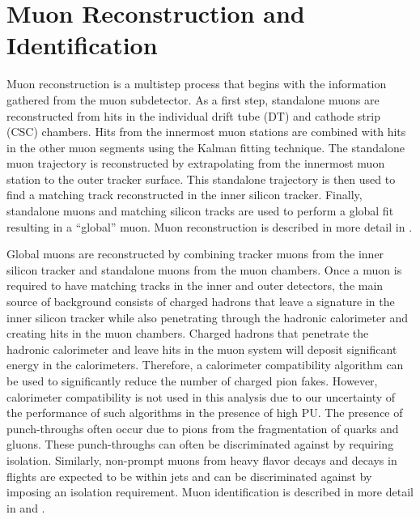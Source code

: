 \chapter{Muon Reconstruction and Identification}\label{ss:muonreco}

Muon reconstruction is a multistep process that begins with the information gathered from the muon subdetector. As a
first step, standalone muons are reconstructed from hits in the individual drift tube (DT) and
cathode strip (CSC) chambers. Hits from the innermost muon stations are combined with hits in the other muon segments
using the Kalman fitting technique. The standalone muon trajectory is reconstructed by extrapolating from the
innermost muon station to the outer tracker surface. This standalone trajectory is then used to find a matching track
reconstructed in the inner silicon tracker. Finally, standalone muons and matching silicon tracks are used to perform a
global fit resulting in a ``global'' muon. Muon reconstruction is described in more detail in \cite{CMS_MUO_10-004}.

Global muons are reconstructed by combining tracker muons from the inner silicon tracker and standalone muons from the
muon chambers. Once a muon is required to have matching tracks in the inner and outer detectors,
the main source of background consists of charged hadrons that leave a
signature in the inner silicon tracker while also penetrating through the hadronic calorimeter and creating hits in the
muon chambers. Charged hadrons that penetrate the hadronic calorimeter and leave hits in the muon system will deposit 
significant energy in the calorimeters. Therefore, a calorimeter compatibility algorithm can be used to significantly 
reduce the number of charged pion fakes. However, calorimeter compatibility is not used in this analysis due to our 
uncertainty of the performance of such algorithms in the presence of high PU. 
The presence of punch-throughs often occur due to pions from the fragmentation of quarks and gluons. These punch-throughs 
can often be discriminated against by requiring isolation. Similarly, non-prompt muons from heavy flavor decays and 
decays in flights are expected to be within jets and can be discriminated against by imposing an isolation requirement. 
Muon identification is described in more detail in \cite{CMS_MUO_10-004} and \cite{CMS_MUO_11-001}.

